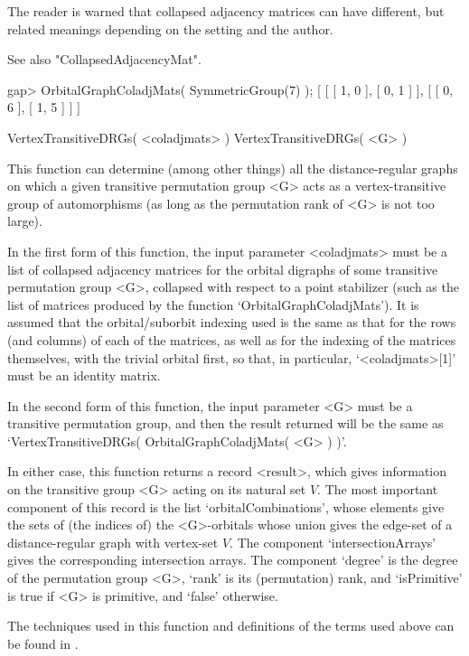 The reader is warned that collapsed adjacency matrices can have different,
but related meanings depending on the setting and the author.

See also "CollapsedAdjacencyMat".

\beginexample
gap> OrbitalGraphColadjMats( SymmetricGroup(7) );
[ [ [ 1, 0 ], [ 0, 1 ] ], [ [ 0, 6 ], [ 1, 5 ] ] ] 
\endexample


\>VertexTransitiveDRGs( <coladjmats> )
\>VertexTransitiveDRGs( <G> )

This function can determine (among other things) all the
distance-regular graphs on which a given transitive permutation group
<G> acts as a vertex-transitive group of automorphisms (as long as the
permutation rank of <G> is not too large).

In the first form of this function, the input parameter <coladjmats>
must be a list of collapsed adjacency matrices for the orbital digraphs
of some transitive permutation group <G>, collapsed with respect to a
point stabilizer (such as the list of matrices produced by the function
`OrbitalGraphColadjMats').  It is assumed that the orbital/suborbit
indexing used is the same as that for the rows (and columns) of each of
the matrices, as well as for the indexing of the matrices themselves,
with the trivial orbital first, so that, in particular,
`<coladjmats>[1]' must be an identity matrix.

In the second form of this function, the input parameter <G> must be a
transitive permutation group, and then the result returned will be
the same as `VertexTransitiveDRGs( OrbitalGraphColadjMats( <G> ) )'.

In either case, this function returns a record <result>, which gives
information on the transitive group <G> acting on its natural set $V$.
The most important component of this record is the list
`orbitalCombinations', whose elements give the sets of (the indices of)
the <G>-orbitals whose union gives the edge-set of a distance-regular
graph with vertex-set $V$. The component `intersectionArrays' gives the
corresponding intersection arrays. The component `degree' is the degree
of the permutation group <G>, `rank' is its (permutation) rank, and
`isPrimitive' is true if <G> is primitive, and `false' otherwise.

The techniques used in this function and definitions of the terms used
above can be found in \cite{PS97}.

